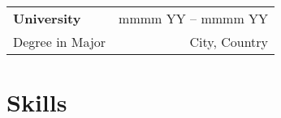 \documentclass[11pt]{article}
\newcommand{\allskills}{}
\begin{document}
\vspace{0.1em}

\blinditemize[3]

\vspace{0.75em}

\begin{tabularx}{\textwidth}{@{}X r@{}} %
	\fontsize{14pt}{0pt}\selectfont\textbf{University} & mmmm YY – mmmm YY \\
	Degree in Major                                    & City, Country     \\
\end{tabularx}

\vspace{0.1em}

\blinditemize[3]

\vspace{0.5em}
\section*{Skills\hspace{0.5em}\hrulefill}

\begin{tabularx}{\textwidth}{@{}l L{\textwidth}}
	\allskills
\end{tabularx}

\newpage
\layout*
\end{document}
